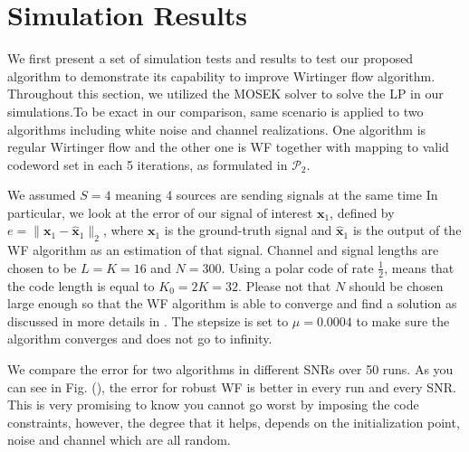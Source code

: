 \section{Simulation Results}

We first present a set of simulation tests and results to test our proposed algorithm to demonstrate its capability to improve Wirtinger flow algorithm.
Throughout this section, we utilized the MOSEK solver \cite{andersenmosek} 
to solve the LP in our simulations.To be exact in our comparison, same scenario is applied to two algorithms including white noise and channel realizations. One algorithm is
regular Wirtinger flow and the other one is WF together with mapping to valid codeword set in each 5 iterations, as formulated in $\mathcal{P}_2$. 

We assumed $S = 4$ meaning 4 sources are sending signals at the same time In particular, we look at the error of our signal of interest 
$\mathbf{x}_1$, defined by $e = \parallel \mathbf{x}_1 - \hat{\mathbf{x}}_1 \parallel_2$,
where $\mathbf{x}_1$ is the ground-truth signal and $\hat{\mathbf{x}}_1$ is the output of the WF algorithm as an estimation of that signal.
Channel and signal lengths are chosen to be $L = K = 16$ and $N = 300$. Using a polar code of rate $\frac{1}{2}$, means that the code length is equal to $K_0 = 2K = 32$.
Please not that $N$ should be chosen large enough so 
that the WF algorithm is able to converge and find a solution as discussed in more details in \cite{dong2018nonconvex}. The stepsize is set to $\mu = 0.0004$ to make sure 
the algorithm converges and does not go to infinity.


We compare the error for two algorithms in different SNRs over 50 runs. As you can see in Fig. (), the error for 
robust WF is better in every run and every SNR. This is very promising to know you cannot go worst by imposing the code constraints, however, the degree that it helps,
depends on the initialization point, noise and channel which are all random. 




